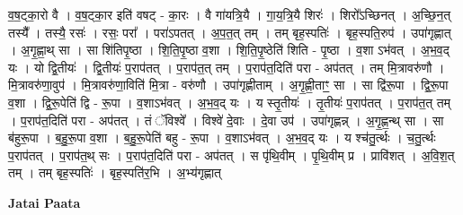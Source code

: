 \documentclass[17pt]{extarticle}
\begin{document}
व॒ष॒ट्का॒रो वै । व॒ष॒ट्का॒र इति॑ वषट् - का॒रः । वै गा॑यत्रि॒यै । गा॒य॒त्रि॒यै शिरः॑ । शिरो᳚ऽच्छिनत् । अ॒च्छि॒न॒त् तस्यै᳚ । तस्यै॒ रसः॑ । रसः॒ परा᳚ । परा॑ऽपतत् । अ॒प॒त॒त् तम् । तम् बृह॒स्पतिः॑ । बृह॒स्पति॒रुप॑ । उपा॑गृह्णात् । अ॒गृ॒ह्णा॒थ् सा । सा शि॑तिपृ॒ष्ठा । शि॒ति॒पृ॒ष्ठा व॒शा । शि॒ति॒पृ॒ष्ठेति॑ शिति - पृ॒ष्ठा । व॒शा ऽभ॑वत् । अ॒भ॒व॒द् यः । यो द्वि॒तीयः॑ । द्वि॒तीयः॑ प॒राप॑तत् । प॒राप॑त॒त् तम् । प॒राप॑त॒दिति॑ परा - अप॑तत् । तम् मि॒त्रावरु॑णौ । मि॒त्रावरु॑णा॒वुप॑ । मि॒त्रावरु॑णा॒विति॑ मि॒त्रा - वरु॑णौ । उपा॑गृह्णीताम् । अ॒गृ॒ह्णी॒ताꣳ॒॒ सा । सा द्वि॑रू॒पा । द्वि॒रू॒पा व॒शा । द्वि॒रू॒पेति॑ द्वि - रू॒पा । व॒शाऽभ॑वत् । अ॒भ॒व॒द् यः । य स्तृ॒तीयः॑ । तृ॒तीयः॑ प॒राप॑तत् । प॒राप॑त॒त् तम् । प॒राप॑त॒दिति॑ परा - अप॑तत् । तं ॅविश्वे᳚ । विश्वे॑ दे॒वाः । दे॒वा उप॑ । उपा॑गृह्णन्न् । अ॒गृ॒ह्ण॒न्थ् सा । सा ब॑हुरू॒पा । ब॒हु॒रू॒पा व॒शा । ब॒हु॒रू॒पेति॑ बहु - रू॒पा । व॒शाऽभ॑वत् । अ॒भ॒व॒द् यः । य श्च॑तु॒र्त्थः । च॒तु॒र्त्थः प॒राप॑तत् । प॒राप॑त॒थ् सः । प॒राप॑त॒दिति॑ परा - अप॑तत् । स पृ॑थि॒वीम् । पृ॒थि॒वीम् प्र । प्रावि॑शत् । अ॒वि॒श॒त् तम् । तम् बृह॒स्पतिः॑ । बृह॒स्पति॑र॒भि । अ॒भ्य॑गृह्णात् \newline

\textbf{Jatai Paata} \newline
\end{document}
